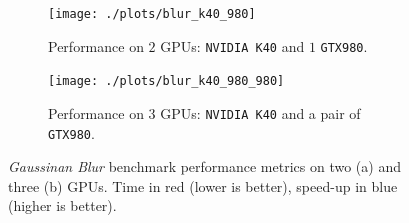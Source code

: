 \begin{figure}[!htb]
    \begin{subfigure}{1.0\textwidth}
        \caption{Performance on $2$ GPUs: \texttt{NVIDIA K40} and $1$ \texttt{GTX980}.}
        \label{fig:blur_k40_980}
        \texttt{[image: ./plots/blur\_k40\_980]}
        
    \end{subfigure}        
    \endminipage \hfill
    \vspace{5mm}
    \begin{subfigure}{1.0\textwidth}
        \texttt{[image: ./plots/blur\_k40\_980\_980]}
        \caption{Performance on $3$ GPUs: \texttt{NVIDIA K40} and a pair of \texttt{GTX980}.}
        \label{fig:blur_k40_980_980}
    \end{subfigure}
    \endminipage\hfill
    \caption[\textit{Gaussinan Blur} benchmark performance metrics.]{\textit{Gaussinan Blur} benchmark performance metrics on two (a) and three (b) GPUs. Time in red (lower is better), speed-up in blue (higher is better).}
    \label{fig:blur_performance}
\end{figure}


